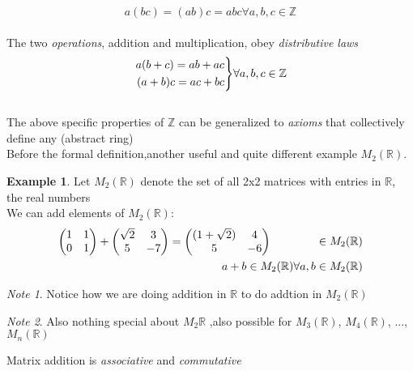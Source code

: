 \documentclass{article}
\theoremstyle{plain}
\theoremstyle{definition}
\newtheorem{exmp}{Example}[section]
\theoremstyle{remark}
\newtheorem*{note}{Note}
\newenvironment{rcases}
  {\left.\begin{aligned}}
  {\end{aligned}\right\rbrace}
\begin{document}
\begin{equation}
	a(bc) = (ab)c = abc \forall a,b,c \in \mathbb{Z}
\end{equation}\\
The two \textit{operations}, addition and multiplication, obey \textit{distributive laws}
\begin{equation}
\begin{rcases}
	a(b + c) = ab + ac \\
	(a + b)c = ac + bc  \\
\end{rcases} \forall a,b,c \in \mathbb{Z}
\end{equation}\\
The above specific properties of $\mathbb{Z}$ can be generalized to \textit{axioms} that collectively define any (abstract ring)\\
Before the formal definition,another useful and quite different example $M_2(\mathbb{R})$.\\
\begin{exmp}
	Let $M_2(\mathbb{R})$ denote the set of all 2x2 matrices with entries in $\mathbb{R}$, the real numbers\\
	We can add elements of $M_2(\mathbb{R})$:
	\begin{align}
		\begin{pmatrix} 1 & 1 \\ 0 & 1 \end{pmatrix}	+ 	\begin{pmatrix} \sqrt{2} & 3 \\ 5 & -7 \end{pmatrix} = \begin{pmatrix} (1 + \sqrt{2}) & 4 \\ 5 & -6 \end{pmatrix} \hspace{40px} \in M_2(\mathbb{R}) \\
		a + b \in M_2(\mathbb{R}) \forall a,b \in M_2(\mathbb{R})
	\end{align}
\end{exmp}
\begin{note}
	Notice how we are doing addition in $\mathbb{R}$ to do addtion in $M_2(\mathbb{R})$
\end{note}
\begin{note}
	Also nothing special about $M_2\mathbb{R}$ ,also possible for $M_3(\mathbb{R})$, $M_4(\mathbb{R})$, ..., $M_n(\mathbb{R})$
\end{note}
Matrix addition is \textit{associative} and \textit{commutative}\\
\end{document}
